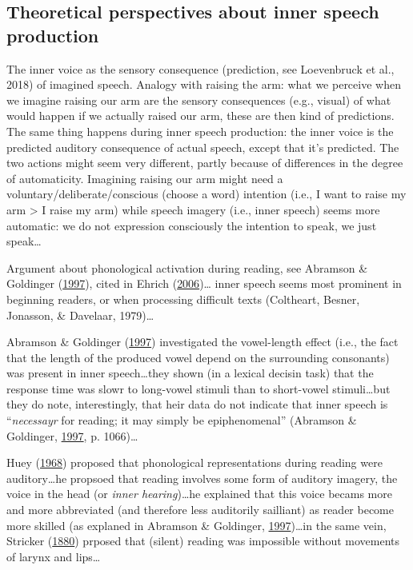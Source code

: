 \documentclass[a4paper,12pt,twoside,openright,oldfontcommands]{memoir}
\begin{document}
\hypertarget{theoretical-perspectives-about-inner-speech-production}{%
\subsection{Theoretical perspectives about inner speech production}\label{theoretical-perspectives-about-inner-speech-production}}

The inner voice as the sensory consequence (prediction, see Loevenbruck et al., 2018) of imagined speech. Analogy with raising the arm: what we perceive when we imagine raising our arm are the sensory consequences (e.g., visual) of what would happen if we actually raised our arm, these are then kind of predictions. The same thing happens during inner speech production: the inner voice is the predicted auditory consequence of actual speech, except that it's predicted. The two actions might seem very different, partly because of differences in the degree of automaticity. Imagining raising our arm might need a voluntary/deliberate/conscious (choose a word) intention (i.e., I want to raise my arm \textgreater{} I raise my arm) while speech imagery (i.e., inner speech) seems more automatic: we do not expression consciously the intention to speak, we just speak\ldots{}

Argument about phonological activation during reading, see Abramson \& Goldinger (\protect\hyperlink{ref-abramson_what_1997}{1997}), cited in Ehrich (\protect\hyperlink{ref-ehrich_vygotskian_2006}{2006})\ldots{} inner speech seems most prominent in beginning readers, or when processing difficult texts (Coltheart, Besner, Jonasson, \& Davelaar, 1979)\ldots{}

Abramson \& Goldinger (\protect\hyperlink{ref-abramson_what_1997}{1997}) investigated the vowel-length effect (i.e., the fact that the length of the produced vowel depend on the surrounding consonants) was present in inner speech\ldots they shown (in a lexical decisin task) that the response time was slowr to long-vowel stimuli than to short-vowel stimuli\ldots but they do note, interestingly, that heir data do not indicate that inner speech is \enquote{\emph{necessayr} for reading; it may simply be epiphenomenal} (Abramson \& Goldinger, \protect\hyperlink{ref-abramson_what_1997}{1997}, p. 1066)\ldots{}

Huey (\protect\hyperlink{ref-huey_psychology_1968}{1968}) proposed that phonological representations during reading were auditory\ldots he propsoed that reading involves some form of auditory imagery, the voice in the head (or \emph{inner hearing})\ldots he explained that this voice becams more and more abbreviated (and therefore less auditorily sailliant) as reader become more skilled (as explaned in Abramson \& Goldinger, \protect\hyperlink{ref-abramson_what_1997}{1997})\ldots in the same vein, Stricker (\protect\hyperlink{ref-stricker_studien_1880}{1880}) prposed that (silent) reading was impossible without movements of larynx and lips\ldots{}
\end{document}
